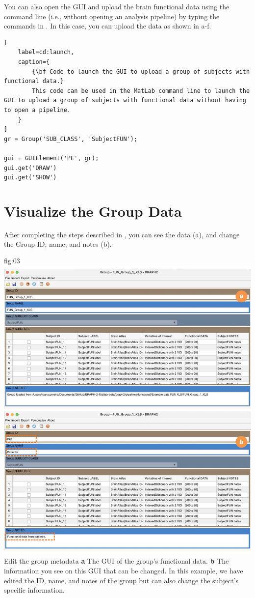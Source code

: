 \documentclass[justified]{tufte-handout}
\begin{document}
\begin{tcolorbox}[
	title=GUI launch from command line
]
You can also open the GUI and upload the brain functional data using the command line (i.e., without opening an analysis pipeline) by typing the commands in . In this case, you can upload the data as shown in a-f.

\begin{lstlisting}[
	label=cd:launch,
	caption={
		{\bf Code to launch the GUI to upload a group of subjects with functional data.}
		This code can be used in the MatLab command line to launch the GUI to upload a group of subjects with functional data without having to open a pipeline.
	}
]
gr = Group('SUB_CLASS', 'SubjectFUN');

gui = GUIElement('PE', gr);
gui.get('DRAW')
gui.get('SHOW')
\end{lstlisting}
\end{tcolorbox}

\section{Visualize the Group Data}

After completing the steps described in , you can see the data (a), and change the Group ID, name, and notes (b). 

	{fig:03}
	{
	\includegraphics{fig03.jpg}
	}
	{Edit the group metadata}
	{ 
	{\bf a} The GUI of the group's functional data. 
	{\bf b} The information you see on this GUI that can be changed. In this example, we have edited the ID, name, and notes of the group but can also change the subject's specific information.
	}
\end{document}
